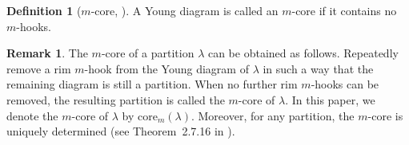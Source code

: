 \documentclass[preprint,3p,10pt]{elsarticle}
\theoremstyle{definition}
\newtheorem{definition}{Definition}[section]
\newtheorem{remark}{Remark}[section]
\begin{document}
\begin{definition}[$m$-core, \cite{james2006representation}]\label{def:core-of-lambda}
A Young diagram  is called an $m$-core if it contains no $m$-hooks.
\end{definition}

\begin{remark}
The \(m\)-core of a partition \(\lambda\) can be obtained as follows. Repeatedly remove a rim \(m\)-hook from the Young diagram of \(\lambda\) in such a way that the remaining diagram is still a partition. When no further rim \(m\)-hooks can be removed, the resulting partition is called the \(m\)-core of \(\lambda\). In this paper, we denote the \(m\)-core of \(\lambda\) by \(\mathrm{core}_m(\lambda)\). Moreover, for any partition, the \(m\)-core is uniquely determined (see Theorem~2.7.16 in \cite{james2006representation}).
\end{remark}
\end{document}
